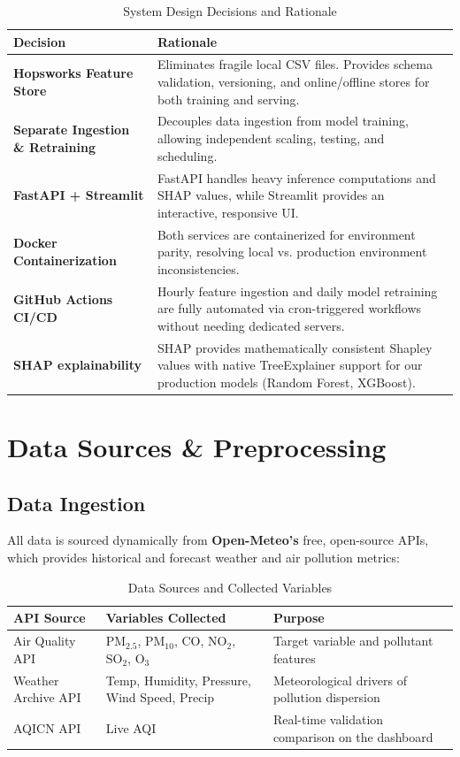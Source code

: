 \documentclass[11pt,a4paper]{article}
\begin{document}
\begin{table}[h!]
\centering
\small
\begin{tabularx}{\textwidth}{l X}
\toprule
\textbf{Decision} & \textbf{Rationale} \\
\midrule
\textbf{Hopsworks Feature Store} & Eliminates fragile local CSV files. Provides schema validation, versioning, and online/offline stores for both training and serving. \\
\addlinespace
\textbf{Separate Ingestion \& Retraining} & Decouples data ingestion from model training, allowing independent scaling, testing, and scheduling. \\
\addlinespace
\textbf{FastAPI + Streamlit} & FastAPI handles heavy inference computations and SHAP values, while Streamlit provides an interactive, responsive UI. \\
\addlinespace
\textbf{Docker Containerization} & Both services are containerized for environment parity, resolving local vs. production environment inconsistencies. \\
\addlinespace
\textbf{GitHub Actions CI/CD} & Hourly feature ingestion and daily model retraining are fully automated via cron-triggered workflows without needing dedicated servers. \\
\addlinespace
\textbf{SHAP explainability} & SHAP provides mathematically consistent Shapley values with native TreeExplainer support for our production models (Random Forest, XGBoost). \\
\bottomrule
\end{tabularx}
\caption{System Design Decisions and Rationale}
\label{tab:decisions}
\end{table}

\newpage
\section{Data Sources \& Preprocessing}

\subsection{Data Ingestion}
All data is sourced dynamically from \textbf{Open-Meteo's} free, open-source APIs, which provides historical and forecast weather and air pollution metrics:

\begin{table}[h!]
\centering
\small
\begin{tabularx}{\textwidth}{l l X}
\toprule
\textbf{API Source} & \textbf{Variables Collected} & \textbf{Purpose} \\
\midrule
Air Quality API & $\text{PM}_{2.5}$, $\text{PM}_{10}$, $\text{CO}$, $\text{NO}_2$, $\text{SO}_2$, $\text{O}_3$ & Target variable and pollutant features \\
Weather Archive API & Temp, Humidity, Pressure, Wind Speed, Precip & Meteorological drivers of pollution dispersion \\
AQICN API & Live AQI & Real-time validation comparison on the dashboard \\
\bottomrule
\end{tabularx}
\caption{Data Sources and Collected Variables}
\label{tab:data_sources}
\end{table}
\end{document}

